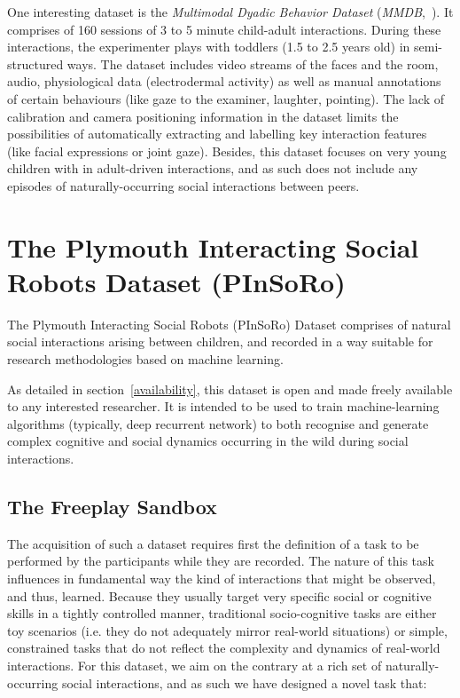 \documentclass{article}
\newcommand{\ie}{i.e.\xspace}
\begin{document}
One interesting dataset is the \emph{Multimodal Dyadic Behavior
Dataset} (\emph{MMDB},~\cite{rehg2013decoding}). It comprises of 160 sessions of
3 to 5 minute child-adult interactions. During these interactions, the
experimenter plays with toddlers (1.5 to 2.5 years old) in semi-structured ways.
The dataset includes video streams of the faces and the room, audio, physiological data
(electrodermal activity) as well as manual annotations of certain behaviours
(like gaze to the examiner, laughter, pointing). The lack of calibration and camera positioning
information in the dataset limits the possibilities of automatically extracting and
labelling key interaction features (like facial expressions or joint gaze). Besides,
this dataset focuses on very young children with in adult-driven interactions,
and as such does not include any episodes of naturally-occurring social
interactions between peers.


\section{The Plymouth Interacting Social Robots Dataset (PInSoRo)}


The Plymouth Interacting Social Robots (PInSoRo) Dataset comprises of natural
social interactions arising between children, and recorded in a way suitable
for research methodologies based on machine learning.

As detailed in section~\ref{availability}, this dataset is open and made freely
available to any interested researcher. It is intended to be used to train
machine-learning algorithms (typically, deep recurrent network) to both
recognise and generate complex cognitive and social dynamics occurring in the
wild during social interactions.

\subsection{The Freeplay Sandbox}

The acquisition of such a dataset requires first the definition of a
task to be performed by the participants while they are recorded. The nature of
this task influences in fundamental way the kind of interactions that might be
observed, and thus, learned.  Because they usually target very specific social
or cognitive skills in a tightly controlled manner, traditional socio-cognitive tasks are
either toy scenarios (\ie they do not adequately mirror real-world situations)
or simple, constrained tasks that do not reflect the complexity and dynamics of
real-world interactions. For this dataset, we aim on the contrary at a rich set
of naturally-occurring social interactions, and as such we have designed a novel
task that:
\end{document}
